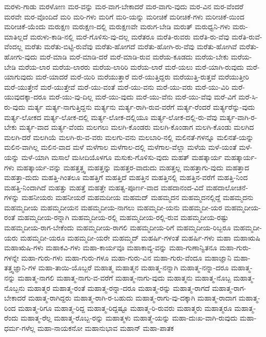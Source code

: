 {ಮರಳು-ಗಾಡು
ಮರಳೋಣ
ಮರ-ವನ್ನು
ಮರ-ವಾಗ-ಬೇಕಾದರೆ
ಮರ-ವಾಗು-ವುದು
ಮರ-ವಿನ
ಮರ-ವೆಂದರೆ
ಮರವೇ
ಮರ-ವೊಂದಿದೆ
ಮರಿ
ಮರಿ-ಗಳು
ಮರಿಗೆ
ಮರಿ-ಯನ್ನು
ಮರೀಚಿಕೆ
ಮರೀಚಿಕೆ-ಗಳು
ಮರೀಚಿಕೆ-ಯಿಂದ
ಮರೀಚಿಕೆ-ಯೆಂದು
ಮರುಕ್ಷಣ
ಮರುಕ್ಷಣ-ದಲ್ಲಿ
ಮರುಕ್ಷಣವೇ
ಮರುಗ-ಬೇಡಿ
ಮರುತ್
ಮರುಧ್ವನಿ-ಗಳು
ಮರು-ಮಾತಿಲ್ಲದೆ
ಮರುಳು-ಕಾಡಿ-ನಲ್ಲಿ
ಮರೆ-ಗೊಳಿಸು-ವು-ದಲ್ಲ
ಮರೆತರೂ
ಮರೆತಿ-ರುವರು
ಮರೆತಿ-ರು-ವೆವು
ಮರೆತಿ-ರುವೆ-ವೆಂದಲ್ಲ
ಮರೆತು
ಮರೆತು-ಬಿಟ್ಟಿ-ರುವೆವು
ಮರೆತು-ಹೋಗದೆ
ಮರೆತು-ಹೋಗಿ-ರು-ವೆವು
ಮರೆತು-ಹೋಗಿವೆ
ಮರೆತು-ಹೋಗು-ವುದು
ಮರೆ-ಮಾಡಿ
ಮರೆ-ಮಾಡಿ-ದರೆ
ಮರೆ-ಮಾಡಿ-ರುವ
ಮರೆಯ-ಕೂಡದು
ಮರೆಯ-ಬೇಕು
ಮರೆಯ-ಬೇಡಿ
ಮರೆಯ-ಲಾರ
ಮರೆಯ-ಲಾರರು
ಮರೆಯ-ಲಾರಿರಿ
ಮರೆಯ-ಲಾರೆ
ಮರೆ-ಯಲು
ಮರೆ-ಯಾಗಿ-ರುವುದು
ಮರೆ-ಯಾಗುವುದು
ಮರೆ-ಯಾದರೆ
ಮರೆ-ಯಿರಿ
ಮರೆಯುತ್ತಾರೆ
ಮರೆ-ಯುತ್ತಿದ್ದರು
ಮರೆಯುತ್ತಿ-ರುತ್ತವೆ
ಮರೆಯುತ್ತೀರಿ
ಮರೆ-ಯುತ್ತೇನೆ
ಮರೆ-ಯುತ್ತೇವೆ
ಮರೆ-ಯು-ವಂತೆ
ಮರೆ-ಯು-ವನು
ಮರೆ-ಯು-ವರು
ಮರೆ-ಯು-ವಿರಿ
ಮರೆ-ಯುವುದಕ್ಕಾ-ದರೂ
ಮರೆ-ಯು-ವು-ದಿಲ್ಲ
ಮರೆ-ಯು-ವುದು
ಮರೆ-ಯು-ವೆನು
ಮರೆ-ಯು-ವೆವು
ಮರೆ-ವಿಗೆ
ಮರೆ-ಸಿ-ರು-ವುದು
ಮರ್ತ್ಯ
ಮರ್ತ್ಯ-ನಾಗುತ್ತಿದ್ದನು
ಮರ್ತ್ಯನು
ಮರ್ತ್ಯ-ರಾಗಿ-ರುವ-ವರೆಗೆ
ಮರ್ತ್ಯ-ರೆಂದರೆ
ಮರ್ತ್ಯರೆನ್ನು-ವುದು
ಮರ್ತ್ಯ-ಲೋಕದ
ಮರ್ತ್ಯ-ಲೋಕ-ದಲ್ಲಿ
ಮರ್ತ್ಯ-ಲೋಕ-ದಲ್ಲಿಯೂ
ಮರ್ತ್ಯ-ಲೋಕ-ದಲ್ಲಿ-ರು-ವೆವು
ಮರ್ತ್ಯ-ವಾಗಿ-ರ-ಬೇಕು
ಮರ್ತ್ಯ-ವಾದ
ಮರ್ತ್ಯ-ವೆಂದು
ಮಲಗಲು
ಮಲಗಿ-ಕೊಂಡರು
ಮಲಗಿ-ಕೊಂಡಾಗ
ಮಲಗಿ-ಕೊಂಡು
ಮಲಗಿದ
ಮಲಗಿ-ದರೆ
ಮಲಗಿಯೆ
ಮಲಗಿ-ರು-ವ-ವರು
ಮಲಗು-ವನು
ಮಲಬಾರಿ-ನಲ್ಲಿ
ಮಲಿನತೆ-ಗಳನ್ನೂ
ಮಲಿನತೆ-ಯನ್ನು
ಮಲಿನ-ವಾಗಿಲ್ಲ
ಮಲಿನ-ವಾದ
ಮಳೆ
ಮಳೆಗಾಲ
ಮಳೆಗಾಲ-ದಲ್ಲಿ
ಮಳೆಗಾಲ-ವೆಲ್ಲಾ
ಮಳೆಯ
ಮಳೆ-ಯಂತೆ
ಮಳೆ-ಯನ್ನು
ಮಳೆ-ಯಾಗಿ
ಮಸಾಲೆ
ಮಸೀದಿಯೊಳಗೂ
ಮಸುಕು-ಗೊಳಿಸು-ವುದು
ಮಹತ್
ಮಹತ್ಕಾರ್ಯ
ಮಹತ್ಕಾರ್ಯ-ಗಳು
ಮಹತ್ಕಾರ್ಯ-ವನ್ನು
ಮಹತ್ತತ್ತ್ವ
ಮಹತ್ತನ್ನು
ಮಹತ್ತರ-ವಾದುದು
ಮಹತ್ತಲ್ಲ
ಮಹತ್ತಾಗು-ವುದು
ಮಹತ್ತಾದ
ಮಹತ್ತಾ-ದುದು
ಮಹತ್ತಿ-ಗಿಂತಲೂ
ಮಹತ್ತಿಗೆ
ಮಹತ್ತಿದೆ
ಮಹತ್ತಿನ
ಮಹತ್ತಿನಲ್ಲಿ
ಮಹತ್ತಿನ-ವರೆಗೆ
ಮಹತ್ತಿ-ನಿಂದ
ಮಹತ್ತಿ-ನಿಂದಾಗಿದೆ
ಮಹತ್ತು
ಮಹತ್ತೆ
ಮಹತ್ತೇ
ಮಹತ್ವ-ಪೂರ್ಣ-ವಾದ
ಮಹದಾನಂದ-ವಿದೆ
ಮಹದಾಲೋಚನೆ-ಗಳನ್ನು
ಮಹನೀಯರು
ಮಹನೀಯರೆ
ಮಹಮದೀಯ
ಮಹಮದ್
ಮಹಮ್ಮದನ
ಮಹಮ್ಮದನಲ್ಲಿದ್ದೆ
ಮಹಮ್ಮದನು
ಮಹಮ್ಮದೀಯ
ಮಹಮ್ಮದೀಯನ
ಮಹಮ್ಮದೀಯ-ನಾಗಲು
ಮಹಮ್ಮದೀ-ಯನು
ಮಹಮ್ಮದೀ-ಯರ
ಮಹಮ್ಮದೀಯ-ರಂತೆ
ಮಹಮ್ಮದೀಯ-ರನ್ನಾಗಿ
ಮಹಮ್ಮದೀಯ-ರಲ್ಲಿ
ಮಹಮ್ಮದೀಯ-ರಲ್ಲಿ-ರುವ
ಮಹಮ್ಮದೀಯ-ರಷ್ಟು
ಮಹಮ್ಮದೀಯ-ರಾಗ-ಬೇಕೆಂದು
ಮಹಮ್ಮದೀಯ-ರಾಗಲಿ
ಮಹಮ್ಮದೀಯ-ರಿಗೆ
ಮಹಮ್ಮದೀಯ-ರಿಬ್ಬರೂ
ಮಹಮ್ಮದೀ-ಯರು
ಮಹಮ್ಮದೀ-ಯರೂ
ಮಹಮ್ಮದೀ-ಯರೇ
ಮಹಮ್ಮದ್
ಮಹರ್ಷಿ-ಗಳಂತೆ
ಮಹರ್ಷಿ-ಗಳು
ಮಹಾ
ಮಹಾಋಷಿ
ಮಹಾಋಷಿ-ಗಳು
ಮಹಾಕವಿ-ಗಳು
ಮಹಾ-ಕಾರ್ಯವೂ
ಮಹಾಕಾವ್ಯ-ವನ್ನು
ಮಹಾ-ಗುಣಾನ್ವಿತನೂ
ಮಹಾ-ಗುರು-ಗಳನ್ನೇ
ಮಹಾ-ಗುರು-ಗಳು
ಮಹಾ-ಗುರು-ಗಳೂ
ಮಹಾ-ಗುರು-ವಿನ
ಮಹಾ-ಗುರು-ವೆಂದೂ
ಮಹಾಜ್ಞಾನಿ
ಮಹಾ-ತತ್ತ್ವಜ್ಞಾನಿ-ಗಳ
ಮಹಾ-ತಾಯಿ-ಯೊಬ್ಬರೆ
ಮಹಾತ್ಮ
ಮಹಾತ್ಮನ
ಮಹಾತ್ಮ-ನನ್ನಾಗಿ
ಮಹಾತ್ಮ-ನನ್ನಾ-ದರೂ
ಮಹಾತ್ಮ-ನನ್ನು
ಮಹಾತ್ಮ-ನಾಗಲಿ
ಮಹಾತ್ಮ-ನಾಗು-ವ-ವರೆಗೆ
ಮಹಾತ್ಮ-ನಾಗು-ವುದು
ಮಹಾತ್ಮನು
ಮಹಾತ್ಮ-ನೊಬ್ಬ
ಮಹಾತ್ಮ-ನೊಬ್ಬನು
ಮಹಾತ್ಮರ
ಮಹಾತ್ಮ-ರಂತೆ
ಮಹಾತ್ಮ-ರನ್ನಾ-ದರೂ
ಮಹಾತ್ಮ-ರನ್ನು
ಮಹಾತ್ಮ-ರಾಗದೆ
ಮಹಾತ್ಮ-ರಾಗ-ಬೇಕಾದರೆ
ಮಹಾತ್ಮ-ರಾಗಿದ್ದರು
ಮಹಾತ್ಮ-ರಾಗಿ-ರ-ಬಹುದು
ಮಹಾತ್ಮ-ರಾಗು-ವು-ದಕ್ಕಾಗಿ
ಮಹಾತ್ಮ-ರಾದಾಗ
ಮಹಾತ್ಮ-ರಿಂದ
ಮಹಾತ್ಮ-ರಿಗೂ
ಮಹಾತ್ಮ-ರಿದ್ದ
ಮಹಾತ್ಮ-ರಿದ್ದಷ್ಟೂ
ಮಹಾತ್ಮ-ರಿ-ರುವರು
ಮಹಾತ್ಮರು
ಮಹಾತ್ಮರೂ
ಮಹಾತ್ಮ-ರೆಂದು
ಮಹಾತ್ಮ-ರೆಲ್ಲ
ಮಹಾತ್ಮ-ರೊಬ್ಬ-ರನ್ನು
ಮಹಾತ್ಮಳು
ಮಹಾತ್ಮೆ-ಯನ್ನು
ಮಹಾ-ದುಃಖ-ವಾಗಿ-ರುವುದು
ಮಹಾ-ಧರ್ಮ-ಗಳೆಲ್ಲ
ಮಹಾ-ನಾಯಕನೋ
ಮಹಾನುಭಾವ
ಮಹಾನ್
ಮಹಾ-ಪಾತಕ
}
